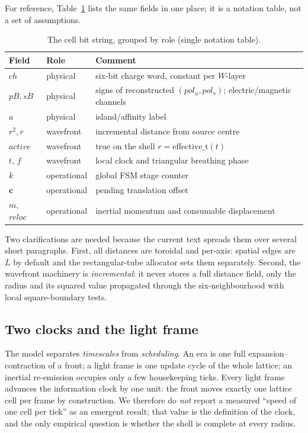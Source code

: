 For reference, Table~\ref{tab:cell-state-demo} lists the same fields in one
place; it is a notation table, not a set of assumptions.

\begin{table}[ht]
\centering
\small
\begin{tabular}{lll}
\hline
Field & Role & Comment\\
\hline
$ch$      & physical & six-bit charge word, constant per $W$-layer\\
$pB,sB$   & physical & signs of reconstructed $(pol_u,pol_v)$; electric/magnetic channels\\
$a$       & physical & island/affinity label\\
$r^2,r$   & wavefront & incremental distance from source centre\\
$\mathit{active}$ & wavefront & true on the shell $r=\mathrm{effective\_t}(t)$\\
$t$, $f$  & wavefront & local clock and triangular breathing phase\\
$k$       & operational & global FSM stage counter\\
$\mathbf{c}$ & operational & pending translation offset\\
$m$, $reloc$ & operational & inertial momentum and consumable displacement\\
\hline
\end{tabular}
\caption{The cell bit string, grouped by role (single notation table).}
\label{tab:cell-state-demo}
\end{table}

Two clarifications are needed because the current text spreads them over
several short paragraphs.  First, all distances are toroidal and per-axis:
spatial edges are $L$ by default and the rectangular-tube allocator sets
them separately.  Second, the wavefront machinery is \emph{incremental}: it
never stores a full distance field, only the radius and its squared value
propagated through the six-neighbourhood with local square-boundary tests.

\subsection{Two clocks and the light frame}
\label{subsec:light-frame-demo}

The model separates \emph{timescales} from \emph{scheduling}.  An era is one
full expansion--contraction of a front; a light frame is one update cycle of
the whole lattice; an inertial re-emission occupies only a few housekeeping
ticks.  Every light frame advances the information clock by one unit: the
front moves exactly one lattice cell per frame by construction.  We therefore
do \emph{not} report a measured ``speed of one cell per tick'' as an emergent
result; that value is the definition of the clock, and the only empirical
question is whether the shell is complete at every radius.

